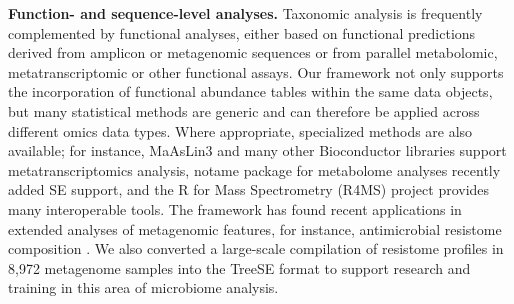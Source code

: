 \documentclass[
  sn-nature,
]{sn-jnl}
\begin{document}
\textbf{Function- and sequence-level analyses.} Taxonomic analysis is
frequently complemented by functional analyses, either based on
functional predictions derived from amplicon or metagenomic sequences or
from parallel metabolomic, metatranscriptomic or other functional
assays. Our framework not only supports the incorporation of functional
abundance tables within the same data objects, but many statistical
methods are generic and can therefore be applied across different omics
data types. Where appropriate, specialized methods are also available;
for instance, MaAsLin3 \citep{nickols2026} and many other Bioconductor
libraries support metatranscriptomics analysis, notame package
\citep{klavus2020} for metabolome analyses recently added SE support,
and the R for Mass Spectrometry (R4MS) project provides many
interoperable tools. The framework has found recent applications in
extended analyses of metagenomic features, for instance, antimicrobial
resistome composition \citep{salehi2025}. We also converted a
large-scale compilation of resistome profiles in 8,972 metagenome
samples \citep{lee2023} into the TreeSE format to support research and
training in this area of microbiome analysis.
\end{document}
